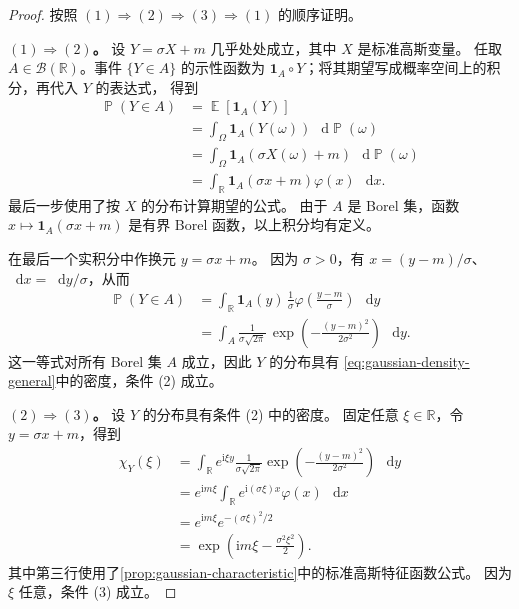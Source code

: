 \documentclass[UTF8,11pt,a4paper,oneside,fontset=fandol]{ctexrep}
\numberwithin{equation}{section}
\theoremstyle{plain}
\theoremstyle{definition}
\theoremstyle{remark}
\newcommand{\R}{\mathbb{R}}
\newcommand{\B}{\mathcal{B}}
\DeclareMathOperator{\Prob}{\mathbb{P}}
\DeclareMathOperator{\E}{\mathbb{E}}
\newcommand{\ind}[1]{\mathbf{1}_{#1}}
\newcommand{\dd}{\mathop{}\!\mathrm{d}}
\begin{document}
\begin{proof}
按照 $(1)\Rightarrow(2)\Rightarrow(3)\Rightarrow(1)$ 的顺序证明。

\textbf{$(1)\Rightarrow(2)$。}
设 $Y=\sigma X+m$ 几乎处处成立，其中 $X$ 是标准高斯变量。
任取 $A\in\B(\R)$。事件 $\{Y\in A\}$ 的示性函数为
$\ind{A}\circ Y$；将其期望写成概率空间上的积分，再代入 $Y$ 的表达式，
得到
\begin{align*}
  \Prob(Y\in A)
  &=\E\!\left[\ind{A}(Y)\right]\\
  &=\int_\Omega\ind{A}\!\left(Y(\omega)\right)\,\dd\Prob(\omega)\\
  &=\int_\Omega
      \ind{A}\!\left(\sigma X(\omega)+m\right)\,\dd\Prob(\omega)\\
  &=\int_{\R}\ind{A}(\sigma x+m)\varphi(x)\,\dd x.
\end{align*}
最后一步使用了按 $X$ 的分布计算期望的公式。
由于 $A$ 是 Borel 集，函数 $x\mapsto\ind{A}(\sigma x+m)$
是有界 Borel 函数，以上积分均有定义。

在最后一个实积分中作换元 $y=\sigma x+m$。
因为 $\sigma>0$，有 $x=(y-m)/\sigma$、$\dd x=\dd y/\sigma$，从而
\begin{align*}
  \Prob(Y\in A)
  &=\int_{\R}\ind{A}(y)\,
       \frac{1}{\sigma}\varphi\!\left(\frac{y-m}{\sigma}\right)\,\dd y\\
  &=\int_A\frac{1}{\sigma\sqrt{2\pi}}\,
       \exp\!\left(-\frac{(y-m)^2}{2\sigma^2}\right)\,\dd y.
\end{align*}
这一等式对所有 Borel 集 $A$ 成立，因此 $Y$ 的分布具有
\cref{eq:gaussian-density-general}中的密度，条件 (2) 成立。

\textbf{$(2)\Rightarrow(3)$。}
设 $Y$ 的分布具有条件 (2) 中的密度。
固定任意 $\xi\in\R$，令 $y=\sigma x+m$，得到
\begin{align*}
  \chi_Y(\xi)
  &=\int_{\R}e^{\mathrm{i}\xi y}
       \frac{1}{\sigma\sqrt{2\pi}}
       \exp\!\left(-\frac{(y-m)^2}{2\sigma^2}\right)\,\dd y\\
  &=e^{\mathrm{i}m\xi}
       \int_{\R}e^{\mathrm{i}(\sigma\xi)x}\varphi(x)\,\dd x\\
  &=e^{\mathrm{i}m\xi}e^{-(\sigma\xi)^2/2}\\
  &=\exp\!\left(\mathrm{i}m\xi-\frac{\sigma^2\xi^2}{2}\right).
\end{align*}
其中第三行使用了\cref{prop:gaussian-characteristic}中的标准高斯特征函数公式。
因为 $\xi$ 任意，条件 (3) 成立。


\end{proof}
\end{document}
